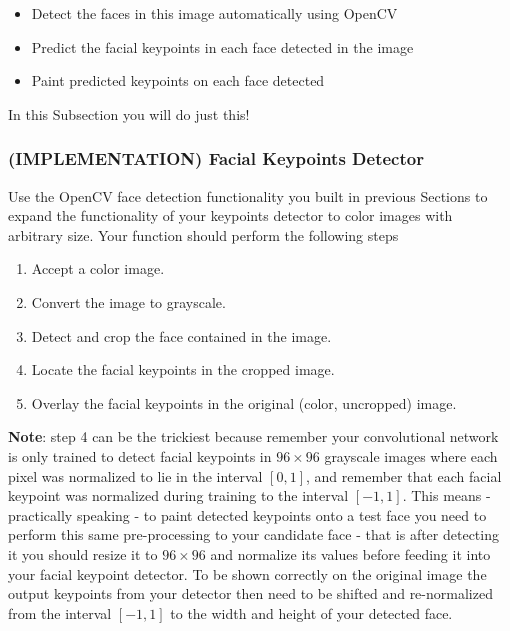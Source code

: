 \documentclass[11pt]{article}
\providecommand{\tightlist}{%
      \setlength{\itemsep}{0pt}\setlength{\parskip}{0pt}}
\begin{document}
\begin{itemize}
\tightlist
\item
  Detect the faces in this image automatically using OpenCV
\item
  Predict the facial keypoints in each face detected in the image
\item
  Paint predicted keypoints on each face detected
\end{itemize}

In this Subsection you will do just this!

    \subsubsection{(IMPLEMENTATION) Facial Keypoints
Detector}\label{implementation-facial-keypoints-detector}

Use the OpenCV face detection functionality you built in previous
Sections to expand the functionality of your keypoints detector to color
images with arbitrary size. Your function should perform the following
steps

\begin{enumerate}
\def\labelenumi{\arabic{enumi}.}
\tightlist
\item
  Accept a color image.
\item
  Convert the image to grayscale.
\item
  Detect and crop the face contained in the image.
\item
  Locate the facial keypoints in the cropped image.
\item
  Overlay the facial keypoints in the original (color, uncropped) image.
\end{enumerate}

\textbf{Note}: step 4 can be the trickiest because remember your
convolutional network is only trained to detect facial keypoints in
\(96 \times 96\) grayscale images where each pixel was normalized to lie
in the interval \([0,1]\), and remember that each facial keypoint was
normalized during training to the interval \([-1,1]\). This means -
practically speaking - to paint detected keypoints onto a test face you
need to perform this same pre-processing to your candidate face - that
is after detecting it you should resize it to \(96 \times 96\) and
normalize its values before feeding it into your facial keypoint
detector. To be shown correctly on the original image the output
keypoints from your detector then need to be shifted and re-normalized
from the interval \([-1,1]\) to the width and height of your detected
face.
\end{document}
